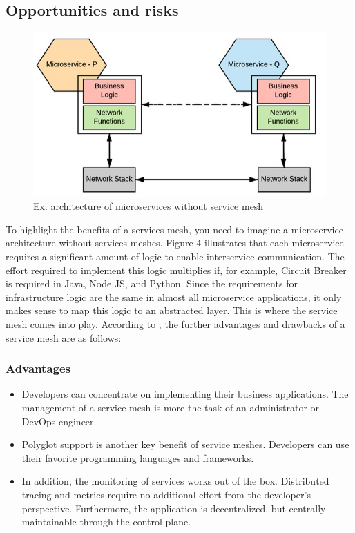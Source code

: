 \subsection{Opportunities and risks}

\begin{figure}
    \includegraphics[width=\columnwidth]{img/microservices_without_mesh.JPG}
    \caption{Ex. architecture of microservices without service mesh\cite[S. 265]{sm4}}
    \label{fig:microservice-without-mesh}
\end{figure}


To highlight the benefits of a services mesh, you need to imagine a microservice architecture without services meshes. Figure 4 illustrates that each microservice requires a significant amount of logic to enable interservice communication. The effort required to implement this logic multiplies if, for example, Circuit Breaker is required in Java, Node JS, and Python. Since the requirements for infrastructure logic are the same in almost all microservice applications, it only makes sense to map this logic to an abstracted layer. This is where the service mesh comes into play. According to \cite{sm4}, the further advantages and drawbacks of a service mesh are as follows:

\subsubsection{Advantages}

\begin{itemize}

    \item Developers can concentrate on implementing their business applications. The management of a service mesh is more the task of an administrator or DevOps engineer.

    \item Polyglot support is another key benefit of service meshes. Developers can use their favorite programming languages and frameworks.

    \item In addition, the monitoring of services works out of the box. Distributed tracing and metrics require no additional effort from the developer's perspective. Furthermore, the application is decentralized, but centrally maintainable through the control plane. 

\end{itemize}
